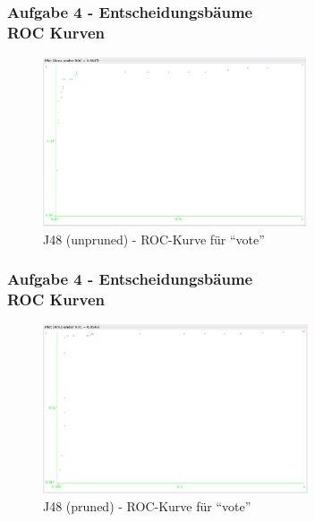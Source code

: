 \documentclass[accentcolor=tud6b,colorbacktitle,inverttitle,landscape,german,presentation,t]{tudbeamer}
\begin{document}
    \begin{frame}[t]
    \frametitle{Aufgabe 4 - Entscheidungsbäume\\ ROC Kurven}
        \begin{figure}[htbp]
            \centering
            \includegraphics[height=5cm]{vote-j48-unpruned}
            \caption{J48 (unpruned) - ROC-Kurve für ``vote''}
        \end{figure}
    \end{frame}
    
    \begin{frame}[t]
    \frametitle{Aufgabe 4 - Entscheidungsbäume\\ ROC Kurven}
        \begin{figure}[htbp]
            \centering
            \includegraphics[height=5cm]{vote-j48-pruned}
            \caption{J48 (pruned) - ROC-Kurve für ``vote''}
        \end{figure}
    \end{frame}
    
\end{document}
